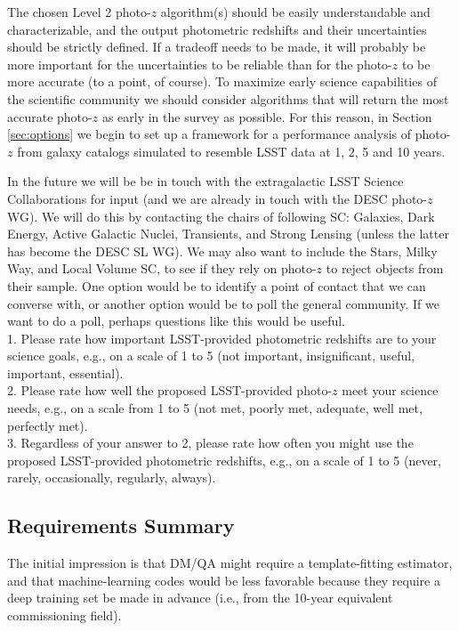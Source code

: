 \documentclass[DM,lsstdraft,toc]{lsstdoc}
\begin{document}
\smallskip
The chosen Level 2 photo-$z$ algorithm(s) should be easily understandable and characterizable, and the output photometric redshifts and their uncertainties should be strictly defined. If a tradeoff needs to be made, it will probably be more important for the uncertainties to be reliable than for the photo-$z$ to be more accurate (to a point, of course). To maximize early science capabilities of the scientific community we should consider algorithms that will return the most accurate photo-$z$ as early in the survey as possible. For this reason, in Section \ref{sec:options} we begin to set up a framework for a performance analysis of photo-$z$ from galaxy catalogs simulated to resemble LSST data at 1, 2, 5 and 10 years.

\smallskip
In the future we will be be in touch with the extragalactic LSST Science Collaborations for input (and we are already in touch with the DESC photo-$z$ WG). We will do this by contacting the chairs of following SC: Galaxies, Dark Energy, Active Galactic Nuclei, Transients, and Strong Lensing (unless the latter has become the DESC SL WG). We may also want to include the Stars, Milky Way, and Local Volume SC, to see if they rely on photo-$z$ to reject objects from their sample. One option would be to identify a point of contact that we can converse with, or another option would be to poll the general community. If we want to do a poll, perhaps questions like this would be useful. \\
1. Please rate how important LSST-provided photometric redshifts are to your science goals, e.g., on a scale of 1 to 5 (not important, insignificant, useful, important, essential). \\
2. Please rate how well the proposed LSST-provided photo-$z$ meet your science needs, e.g., on a scale from 1 to 5 (not met, poorly met, adequate, well met, perfectly met). \\
3. Regardless of your answer to 2, please rate how often you might use the proposed LSST-provided photometric redshifts, e.g., on a scale of 1 to 5 (never, rarely, occasionally, regularly, always).

\subsection{Requirements Summary}

The initial impression is that DM/QA might require a template-fitting estimator, and that machine-learning codes would be less favorable because they require a deep training set be made in advance (i.e., from the 10-year equivalent commissioning field).
\end{document}
